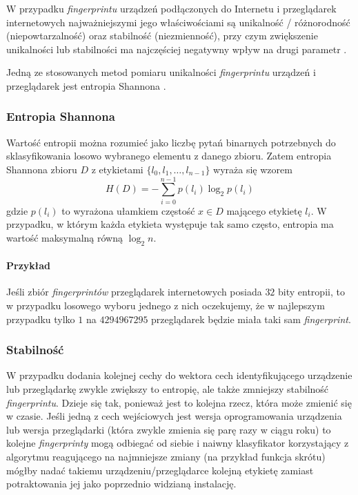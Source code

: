 W przypadku \emph{fingerprintu} urządzeń podłączonych do Internetu i
przeglądarek internetowych najważniejszymi jego właściwościami są unikalność /
różnorodność (niepowtarzalność) oraz stabilność (niezmienność), przy czym
zwiększenie unikalności lub stabilności ma najczęściej negatywny wpływ na drugi
parametr \cite[s. 11]{eckersley2010unique}.

Jedną ze stosowanych metod pomiaru unikalności \emph{fingerprintu} urządzeń i
przeglądarek jest entropia Shannona \cite[s. 6]{eckersley2010unique}.

\subsubsection{Entropia Shannona}
Wartość entropii można rozumieć jako liczbę pytań binarnych potrzebnych do
sklasyfikowania losowo wybranego elementu z danego zbioru. Zatem entropia
Shannona zbioru \(D\) z etykietami \(\{l_{0}, l_{1}, \dots, l_{n - 1}\}\) wyraża
się wzorem \[H(D) = -{\sum_{i = 0}^{n - 1}{p(l_{i})\log_{2}{p(l_{i})}}}\] gdzie
\(p(l_{i})\) to wyrażona ułamkiem częstość \(x \in D\) mającego etykietę
\(l_{i}\). W przypadku, w którym każda etykieta występuje tak samo często,
entropia ma wartość maksymalną równą \(\log_{2}{n}\).

\paragraph{Przykład}
Jeśli zbiór \emph{fingerprintów} przeglądarek internetowych posiada \(32\) bity
entropii, to w przypadku losowego wyboru jednego z nich oczekujemy, że w
najlepszym przypadku tylko \(1\) na \(4294967295\) przeglądarek będzie miała
taki sam \emph{fingerprint}.

\subsubsection{Stabilność}
W przypadku dodania kolejnej cechy do wektora cech identyfikującego urządzenie
lub przeglądarkę zwykle zwiększy to entropię, ale także zmniejszy stabilność
\emph{fingerprintu}. Dzieje się tak, ponieważ jest to kolejna rzecz, która może
zmienić się w czasie. Jeśli jedną z cech wejściowych jest wersja oprogramowania
urządzenia lub wersja przeglądarki (która zwykle zmienia się parę razy w ciągu
roku) to kolejne \emph{fingerprinty} mogą odbiegać od siebie i naiwny
klasyfikator korzystający z algorytmu reagującego na najmniejsze zmiany (na
przykład funkcja skrótu) mógłby nadać takiemu urządzeniu/przeglądarce kolejną
etykietę zamiast potraktowania jej jako poprzednio widzianą instalację.

